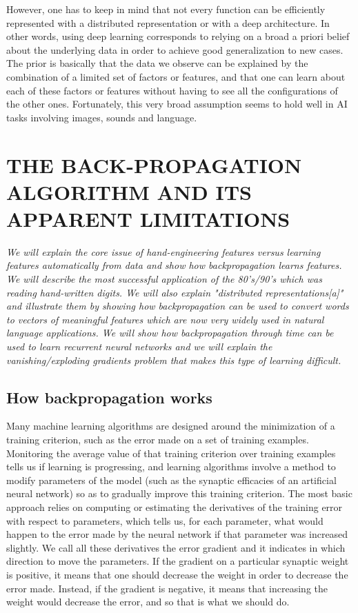 \documentclass[11pt]{article} %
\begin{document}
However, one has to keep in mind that not every function can be efficiently
represented with a distributed representation or with a deep
architecture. In other words, using deep learning corresponds to relying on
a broad a priori belief about the underlying data in order to achieve good
generalization to new cases. The prior is basically that the data we
observe can be explained by the combination of a limited set of factors or
features, and that one can learn about each of these factors or features
without having to see all the configurations of the other
ones. Fortunately, this very broad assumption seems to hold well in AI
tasks involving images, sounds and language.




\section{THE BACK-PROPAGATION ALGORITHM AND ITS APPARENT LIMITATIONS}

{\em 
We will explain the core issue of hand-engineering features versus learning
 features automatically from data and show how backpropagation learns
 features. We will describe the most successful application of the
 80's/90's which was reading hand-written digits. We will also explain
 "distributed representations[a]" and illustrate them by showing how
 backpropagation can be used to convert words to vectors of meaningful
 features which are now very widely used in natural language applications.
  We will show how backpropagation through time can be used to learn
 recurrent neural networks and we will explain the vanishing/exploding
 gradients problem that makes this type of learning difficult.
}

\subsection{How backpropagation works}

Many machine learning algorithms are designed around the minimization of a
training criterion, such as the error made on a set of training
examples. Monitoring the average value of that training criterion over
training examples tells us if learning is progressing, and learning
algorithms involve a method to modify parameters of the model (such as the
synaptic efficacies of an artificial neural network) so as to gradually
improve this training criterion. The most basic approach relies on
computing or estimating the derivatives of the training error with respect
to parameters, which tells us, for each parameter, what would happen to the
error made by the neural network if that parameter was increased
slightly. We call all these derivatives the error gradient and it indicates
in which direction to move the parameters. If the gradient on a particular
synaptic weight is positive, it means that one should decrease the weight
in order to decrease the error made. Instead, if the gradient is negative,
it means that increasing the weight would decrease the error, and so that
is what we should do.
\end{document}
